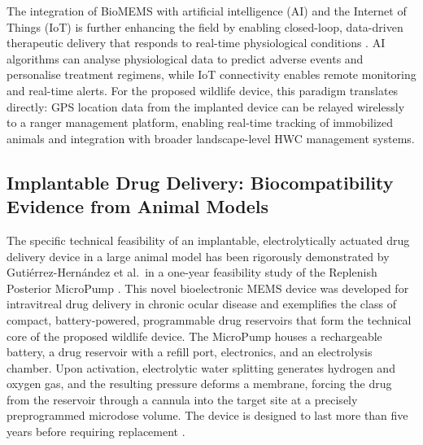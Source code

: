 \documentclass[12pt,a4paper]{article}
\begin{document}
    The integration of BioMEMS with artificial intelligence (AI) and the Internet of Things
    (IoT) is further enhancing the field by enabling closed-loop, data-driven therapeutic
    delivery that responds to real-time physiological conditions \cite{abhinav2025}. AI algorithms
    can analyse physiological data to predict adverse events and personalise treatment
    regimens, while IoT connectivity enables remote monitoring and real-time alerts. For the
    proposed wildlife device, this paradigm translates directly: GPS location data from the
    implanted device can be relayed wirelessly to a ranger management platform, enabling
    real-time tracking of immobilized animals and integration with broader landscape-level
    HWC management systems.

    \subsection{Implantable Drug Delivery: Biocompatibility Evidence from Animal Models}

    The specific technical feasibility of an implantable, electrolytically actuated drug delivery
    device in a large animal model has been rigorously demonstrated by Guti\'errez-Hern\'andez
    et al.\ in a one-year feasibility study of the Replenish Posterior MicroPump \cite{gutierrez2014}.
    This novel bioelectronic MEMS device was developed for intravitreal drug delivery in
    chronic ocular disease and exemplifies the class of compact, battery-powered, programmable
    drug reservoirs that form the technical core of the proposed wildlife device. The MicroPump
    houses a rechargeable battery, a drug reservoir with a refill port, electronics, and an
    electrolysis chamber. Upon activation, electrolytic water splitting generates hydrogen and
    oxygen gas, and the resulting pressure deforms a membrane, forcing the drug from the
    reservoir through a cannula into the target site at a precisely preprogrammed microdose
    volume. The device is designed to last more than five years before requiring replacement
    \cite{gutierrez2014}.
\end{document}
